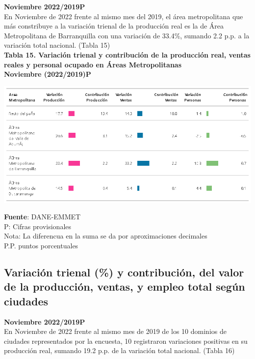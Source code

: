 \documentclass[
]{article}
\begin{document}
\textbf{Noviembre 2022/2019P}\\

En Noviembre de 2022 frente al mismo mes del 2019, el área metropolitana
que más constribuye a la variación trienal de la producción real es la
de Área Metropolitana de Barranquilla con una variación de 33.4\%,
sumando 2.2 p.p. a la variación total nacional. (Tabla 15)\\

\textbf{Tabla 15. Variación trienal y contribución de la producción
real, ventas reales y personal ocupado en Áreas Metropolitanas}\\
\textbf{Noviembre (2022/2019)P}\\

\begin{center}\includegraphics[width=13.14in]{tabla15_1} \end{center}

\textbf{Fuente}: DANE-EMMET\\
P: Cifras provisionales\\
Nota: La diferencua en la suma se da por aproximaciones decimales\\
P.P. puntos porcentuales\\

\hypertarget{variaciuxf3n-trienal-y-contribuciuxf3n-del-valor-de-la-producciuxf3n-ventas-y-empleo-total-seguxfan-ciudades}{%
\subsection{Variación trienal (\%) y contribución, del valor de la
producción, ventas, y empleo total según
ciudades}\label{variaciuxf3n-trienal-y-contribuciuxf3n-del-valor-de-la-producciuxf3n-ventas-y-empleo-total-seguxfan-ciudades}}

\textbf{Noviembre 2022/2019P}\\

En Noviembre de 2022 frente al mismo mes de 2019 de los 10 dominios de
ciudades representados por la encuesta, 10 registraron variaciones
positivas en su producción real, sumando 19.2 p.p. de la variación total
nacional. (Tabla 16)\\
\end{document}
